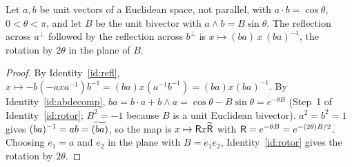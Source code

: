 \begin{identity}\label{id:tworefl}
Let $a,b$ be unit vectors of a Euclidean space, not parallel, with $a\cdot b=\cos\theta$, $0<\theta<\pi$, and let $B$ be the unit
bivector with $a\wedge b=B\sin\theta$. The reflection across $a^\perp$ followed by the reflection across $b^\perp$ is
$x\mapsto(ba)\,x\,(ba)^{-1}$, the rotation by $2\theta$ in the plane of $B$.
\end{identity}
\begin{proof}
 By Identity~\ref{id:refl}, $x\mapsto-b(-axa^{-1})b^{-1}=(ba)x(a^{-1}b^{-1})=(ba)x(ba)^{-1}$.
 By Identity~\ref{id:abdecomp}, $ba=b\cdot a+b\wedge a=\cos\theta-B\sin\theta=e^{-\theta B}$
(Step~1 of Identity~\ref{id:rotor}; $B^2=-1$ because $B$ is a unit Euclidean bivector).
 $a^2=b^2=1$ gives $(ba)^{-1}=ab=\widetilde{(ba)}$, so the map is $x\mapsto\mathsf{R} x\widetilde{\mathsf{R}}$ with
$\mathsf{R}=e^{-\theta B}=e^{-(2\theta)B/2}$. Choosing $e_1=a$ and $e_2$ in the plane with $B=e_1e_2$, Identity~\ref{id:rotor} gives the
rotation by $2\theta$.
\end{proof}
